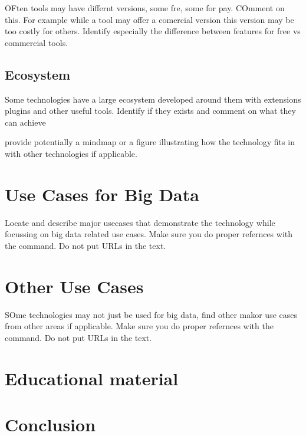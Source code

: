 \documentclass[9pt,twocolumn,twoside]{styles/osajnl}
\begin{document}
OFten tools may have differnt versions, some fre, some for
pay. COmment on this. For example while a tool may offer a comercial
version this version may be too costly for others. Identify especially
the difference between features for free vs commercial tools.

\subsection{Ecosystem}

Some technologies have a large ecosystem developed around them with
extensions plugins and other useful tools. Identify if they exists and
comment on what they can achieve

provide potentially a mindmap or a figure illustrating how the
technology fits in with other technologies if applicable.

\section{Use Cases for Big Data}

Locate and describe major usecases that demonstrate the technology
while focussing on big data related use cases. Make sure you do proper
refernces with the \cite{?} command. Do not put URLs in the text.

\section {Other Use Cases}

SOme technologies may not just be used for big data, find other makor
use cases from other areas if applicable.  Make sure you do proper
refernces with the \cite{?} command. Do not put URLs in the text.

\section{Educational material}

\section{Conclusion}
\end{document}
